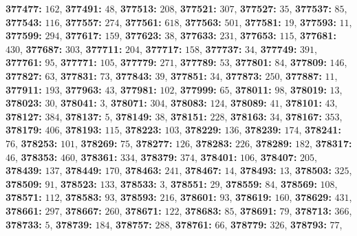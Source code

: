 \textsf{\bfseries 377477:} $162$, \textsf{\bfseries 377491:} $48$, \textsf{\bfseries 377513:} $208$, \textsf{\bfseries 377521:} $307$, \textsf{\bfseries 377527:} $35$, \textsf{\bfseries 377537:} $85$, \textsf{\bfseries 377543:} $116$, \textsf{\bfseries 377557:} $274$, \textsf{\bfseries 377561:} $618$, \textsf{\bfseries 377563:} $501$, \textsf{\bfseries 377581:} $19$, \textsf{\bfseries 377593:} $11$, \textsf{\bfseries 377599:} $294$, \textsf{\bfseries 377617:} $159$, \textsf{\bfseries 377623:} $38$, \textsf{\bfseries 377633:} $231$, \textsf{\bfseries 377653:} $115$, \textsf{\bfseries 377681:} $430$, \textsf{\bfseries 377687:} $303$, \textsf{\bfseries 377711:} $204$, \textsf{\bfseries 377717:} $158$, \textsf{\bfseries 377737:} $34$, \textsf{\bfseries 377749:} $391$, \textsf{\bfseries 377761:} $95$, \textsf{\bfseries 377771:} $105$, \textsf{\bfseries 377779:} $271$, \textsf{\bfseries 377789:} $53$, \textsf{\bfseries 377801:} $84$, \textsf{\bfseries 377809:} $146$, \textsf{\bfseries 377827:} $63$, \textsf{\bfseries 377831:} $73$, \textsf{\bfseries 377843:} $39$, \textsf{\bfseries 377851:} $34$, \textsf{\bfseries 377873:} $250$, \textsf{\bfseries 377887:} $11$, \textsf{\bfseries 377911:} $193$, \textsf{\bfseries 377963:} $43$, \textsf{\bfseries 377981:} $102$, \textsf{\bfseries 377999:} $65$, \textsf{\bfseries 378011:} $98$, \textsf{\bfseries 378019:} $13$, \textsf{\bfseries 378023:} $30$, \textsf{\bfseries 378041:} $3$, \textsf{\bfseries 378071:} $304$, \textsf{\bfseries 378083:} $124$, \textsf{\bfseries 378089:} $41$, \textsf{\bfseries 378101:} $43$, \textsf{\bfseries 378127:} $384$, \textsf{\bfseries 378137:} $5$, \textsf{\bfseries 378149:} $38$, \textsf{\bfseries 378151:} $228$, \textsf{\bfseries 378163:} $34$, \textsf{\bfseries 378167:} $353$, \textsf{\bfseries 378179:} $406$, \textsf{\bfseries 378193:} $115$, \textsf{\bfseries 378223:} $103$, \textsf{\bfseries 378229:} $136$, \textsf{\bfseries 378239:} $174$, \textsf{\bfseries 378241:} $76$, \textsf{\bfseries 378253:} $101$, \textsf{\bfseries 378269:} $75$, \textsf{\bfseries 378277:} $126$, \textsf{\bfseries 378283:} $226$, \textsf{\bfseries 378289:} $182$, \textsf{\bfseries 378317:} $46$, \textsf{\bfseries 378353:} $460$, \textsf{\bfseries 378361:} $334$, \textsf{\bfseries 378379:} $374$, \textsf{\bfseries 378401:} $106$, \textsf{\bfseries 378407:} $205$, \textsf{\bfseries 378439:} $137$, \textsf{\bfseries 378449:} $170$, \textsf{\bfseries 378463:} $241$, \textsf{\bfseries 378467:} $14$, \textsf{\bfseries 378493:} $13$, \textsf{\bfseries 378503:} $325$, \textsf{\bfseries 378509:} $91$, \textsf{\bfseries 378523:} $133$, \textsf{\bfseries 378533:} $3$, \textsf{\bfseries 378551:} $29$, \textsf{\bfseries 378559:} $84$, \textsf{\bfseries 378569:} $108$, \textsf{\bfseries 378571:} $112$, \textsf{\bfseries 378583:} $93$, \textsf{\bfseries 378593:} $216$, \textsf{\bfseries 378601:} $93$, \textsf{\bfseries 378619:} $160$, \textsf{\bfseries 378629:} $431$, \textsf{\bfseries 378661:} $297$, \textsf{\bfseries 378667:} $260$, \textsf{\bfseries 378671:} $122$, \textsf{\bfseries 378683:} $85$, \textsf{\bfseries 378691:} $79$, \textsf{\bfseries 378713:} $366$, \textsf{\bfseries 378733:} $5$, \textsf{\bfseries 378739:} $184$, \textsf{\bfseries 378757:} $288$, \textsf{\bfseries 378761:} $66$, \textsf{\bfseries 378779:} $326$, \textsf{\bfseries 378793:} $77$, 
